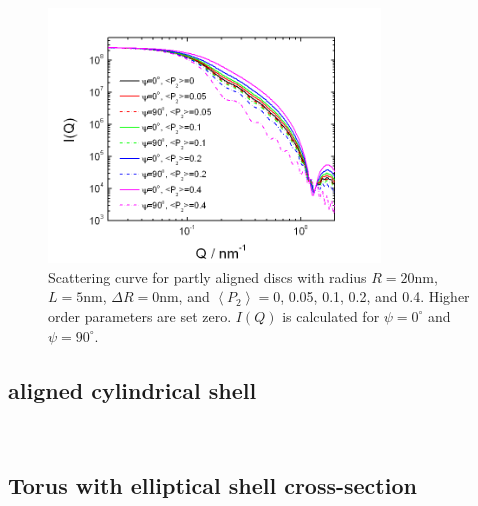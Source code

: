 \begin{figure}[htb]
\begin{center}
\includegraphics[width=0.786\textwidth,height=0.558\textwidth]{../images/form_factor/cylindrical_obj/partly_aligned_CylShell.png}
\end{center}
\caption{Scattering curve for partly aligned discs with radius $R=20$nm, $L=5$nm, $\Delta R=0$nm,
and $\left\langle P_2 \right\rangle=$0, 0.05, 0.1, 0.2, and 0.4. Higher order parameters are set
zero. $I(Q)$ is calculated for $\psi=0^\circ$ and $\psi=90^\circ$.}
\label{fig:partly_aligned_CylShell}
\end{figure}


\newpage

\subsection{aligned cylindrical shell \cite{??}}
\label{sect:alignedCylShell}
\hspace{1pt}\\

\newpage



\subsection{Torus with elliptical shell cross-section \cite{Kawaguchi2001,Forster1999}}
\label{sect:Torus}
\hspace{1pt}\\

